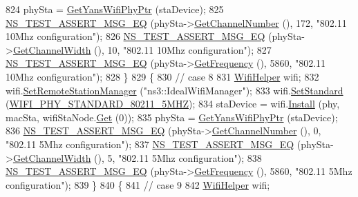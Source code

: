 \begin{DoxyCode}
824     phySta = \hyperlink{classSetChannelFrequencyTest_aa30a0a39f98c2d825152681ba8b9f4e1}{GetYansWifiPhyPtr} (staDevice);
825     \hyperlink{group__testing_ga2a9d78cffb3db8e867c35fff0b698cf5}{NS\_TEST\_ASSERT\_MSG\_EQ} (phySta->\hyperlink{classns3_1_1WifiPhy_a5cf0ccf06109ace61db51c83e91b7e8d}{GetChannelNumber} (), 172, \textcolor{stringliteral}{"802.11
       10Mhz configuration"});
826     \hyperlink{group__testing_ga2a9d78cffb3db8e867c35fff0b698cf5}{NS\_TEST\_ASSERT\_MSG\_EQ} (phySta->\hyperlink{classns3_1_1WifiPhy_a4a5d5009b3b3308f2baeed42a2007189}{GetChannelWidth} (), 10, \textcolor{stringliteral}{"802.11
       10Mhz configuration"});
827     \hyperlink{group__testing_ga2a9d78cffb3db8e867c35fff0b698cf5}{NS\_TEST\_ASSERT\_MSG\_EQ} (phySta->\hyperlink{classns3_1_1WifiPhy_ad2508d94faf22d690d6b8b4367934fd1}{GetFrequency} (), 5860, \textcolor{stringliteral}{"802.11 10Mhz
       configuration"});
828   \}
829   \{
830     \textcolor{comment}{// case 8}
831     \hyperlink{classns3_1_1WifiHelper}{WifiHelper} wifi;
832     wifi.\hyperlink{classns3_1_1WifiHelper_a3d01b178aeb2de246ab5a3aa5638ce24}{SetRemoteStationManager} (\textcolor{stringliteral}{"ns3::IdealWifiManager"});
833     wifi.\hyperlink{classns3_1_1WifiHelper_aa54f3e61527ef8de318d310045bc5dfd}{SetStandard} (\hyperlink{group__wifi_gga1299834f4e1c615af3ca738033b76a49a8311083bdd8ae58e73ab6e81a53fd7be}{WIFI\_PHY\_STANDARD\_80211\_5MHZ});
834     staDevice = wifi.\hyperlink{classns3_1_1WifiHelper_a451b3d33fa1497c22f06c5451f57a127}{Install} (phy, macSta, wifiStaNode.\hyperlink{classns3_1_1NodeContainer_a9ed96e2ecc22e0f5a3d4842eb9bf90bf}{Get} (0));
835     phySta = \hyperlink{classSetChannelFrequencyTest_aa30a0a39f98c2d825152681ba8b9f4e1}{GetYansWifiPhyPtr} (staDevice);
836     \hyperlink{group__testing_ga2a9d78cffb3db8e867c35fff0b698cf5}{NS\_TEST\_ASSERT\_MSG\_EQ} (phySta->\hyperlink{classns3_1_1WifiPhy_a5cf0ccf06109ace61db51c83e91b7e8d}{GetChannelNumber} (), 0, \textcolor{stringliteral}{"802.11
       5Mhz configuration"});
837     \hyperlink{group__testing_ga2a9d78cffb3db8e867c35fff0b698cf5}{NS\_TEST\_ASSERT\_MSG\_EQ} (phySta->\hyperlink{classns3_1_1WifiPhy_a4a5d5009b3b3308f2baeed42a2007189}{GetChannelWidth} (), 5, \textcolor{stringliteral}{"802.11 5Mhz
       configuration"});
838     \hyperlink{group__testing_ga2a9d78cffb3db8e867c35fff0b698cf5}{NS\_TEST\_ASSERT\_MSG\_EQ} (phySta->\hyperlink{classns3_1_1WifiPhy_ad2508d94faf22d690d6b8b4367934fd1}{GetFrequency} (), 5860, \textcolor{stringliteral}{"802.11 5Mhz
       configuration"});
839   \}
840   \{
841     \textcolor{comment}{// case 9}
842     \hyperlink{classns3_1_1WifiHelper}{WifiHelper} wifi;

\end{DoxyCode}
